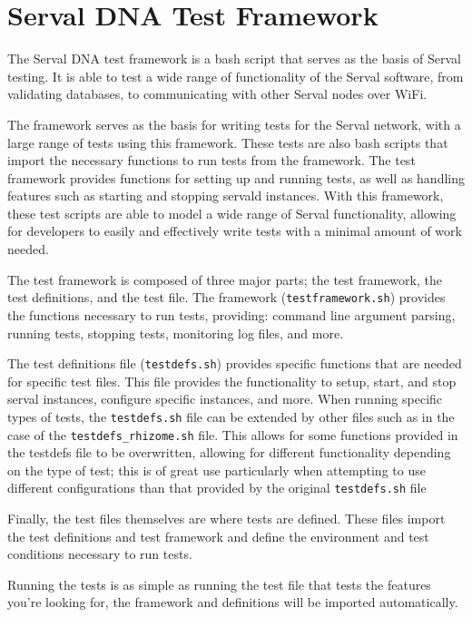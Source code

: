 \section{Serval DNA Test Framework}
The Serval DNA test framework is a bash script that serves as the basis of Serval testing.
It is able to test a wide range of functionality of the Serval software, from validating databases, to communicating with other Serval nodes over WiFi.

The framework serves as the basis for writing tests for the Serval network, with a large range of tests using this framework.
These tests are also bash scripts that import the necessary functions to run tests from the framework. 
The test framework provides functions for setting up and running tests, as well as handling features such as starting and stopping servald instances.
With this framework, these test scripts are able to model a wide range of Serval functionality, allowing for developers to easily and effectively write tests with a minimal amount of work needed.

The test framework is composed of three major parts; the test framework, the test definitions, and the test file.
The framework (\verb|testframework.sh|) provides the functions necessary to run tests, providing: command line argument parsing, running tests, stopping tests, monitoring log files, and more. 

The test definitions file (\verb|testdefs.sh|) provides specific functions that are needed for specific test files.
This file provides the functionality to setup, start, and stop serval instances, configure specific instances, and more.
When running specific types of tests, the \verb|testdefs.sh| file can be extended by other files such as in the case of the \verb|testdefs_rhizome.sh| file. 
This allows for some functions provided in the testdefs file to be overwritten, allowing for different functionality depending on the type of test; this is of great use particularly when attempting to use different configurations than that provided by the original \verb|testdefs.sh| file

Finally, the test files themselves are where tests are defined. 
These files import the test definitions and test framework and define the environment and test conditions necessary to run tests. 

Running the tests is as simple as running the test file that tests the features you're looking for, the framework and definitions will be imported automatically.

